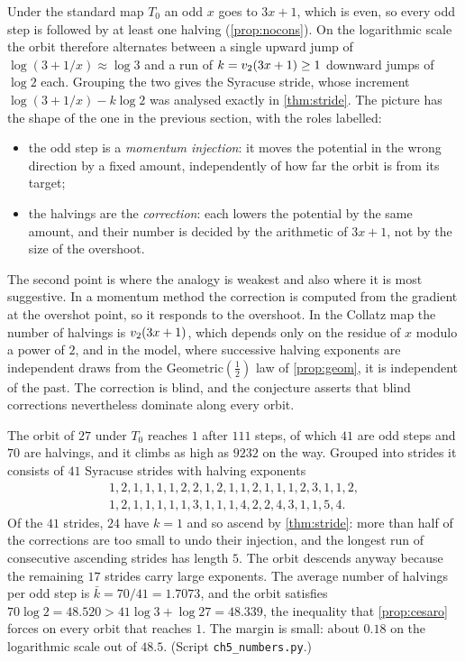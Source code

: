 Under the standard map $T_0$ an odd $x$ goes to $3x+1$, which is even, so every
odd step is followed by at least one halving (\cref{prop:nocons}).  On the
logarithmic scale the orbit therefore alternates between a single upward jump
of $\log(3+1/x)\approx\log 3$ and a run of $k=v_2(3x+1)\ge1$ downward jumps of
$\log 2$ each.  Grouping the two gives the Syracuse stride, whose increment
$\log(3+1/x)-k\log 2$ was analysed exactly in \cref{thm:stride}.  The picture
has the shape of the one in the previous section, with the roles labelled:
\begin{itemize}
\item the odd step is a \emph{momentum injection}: it moves the potential in
  the wrong direction by a fixed amount, independently of how far the orbit is
  from its target;
\item the halvings are the \emph{correction}: each lowers the potential by the
  same amount, and their number is decided by the arithmetic of $3x+1$, not by
  the size of the overshoot.
\end{itemize}
The second point is where the analogy is weakest and also where it is most
suggestive.  In a momentum method the correction is computed from the gradient
at the overshot point, so it responds to the overshoot.  In the Collatz map the
number of halvings is $v_2(3x+1)$, which depends only on the residue of $x$ modulo a power of $2$, and in the
model, where successive halving exponents are independent draws from the
Geometric$(\tfrac12)$ law of \cref{prop:geom}, it is independent of the
past.  The correction is blind, and the conjecture asserts that blind
corrections nevertheless dominate along every orbit.

\begin{example}\label{ex:ch5:27}
The orbit of $27$ under $T_0$ reaches $1$ after $111$ steps, of which $41$ are
odd steps and $70$ are halvings, and it climbs as high as $9232$ on the way.
Grouped into strides it consists of $41$ Syracuse strides with halving
exponents
\[
\begin{gathered}
  1,2,1,1,1,1,2,2,1,2,1,1,2,1,1,1,2,3,1,1,2,\\
  1,2,1,1,1,1,1,3,1,1,1,4,2,2,4,3,1,1,5,4 .
\end{gathered}
\]
Of the $41$ strides, $24$ have $k=1$ and so ascend by \cref{thm:stride}: more
than half of the corrections are too small to undo their injection, and the
longest run of consecutive ascending strides has length $5$.  The orbit
descends anyway because the remaining $17$ strides carry large exponents.  The
average number of halvings per odd step is $\bar k=70/41=1.7073$, and the
orbit satisfies $70\log2=48.520>41\log3+\log 27=48.339$, the inequality that
\cref{prop:cesaro} forces on every orbit that reaches $1$.  The margin is
small: about $0.18$ on the logarithmic scale out of $48.5$.  (Script
\texttt{ch5\_numbers.py}.)
\end{example}

